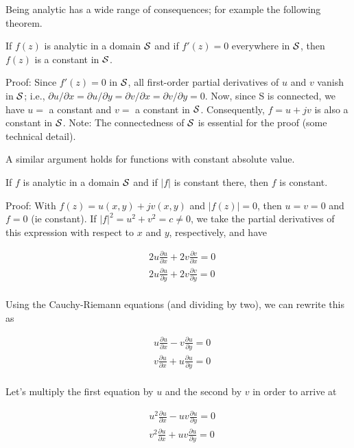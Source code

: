 Being analytic has a wide range of consequences; for example the following theorem.

\begin{theorem}
    If $f(z)$ is analytic in a domain $\mathcal{S}$ and if $f'(z) = 0$ everywhere in $\mathcal{S}$, then $f(z)$ is a constant in $\mathcal{S}$.
\end{theorem}

Proof: Since $f'(z) = 0$ in $\mathcal{S}$, all first-order partial derivatives of $u$ and $v$ vanish in $\mathcal{S}$; i.e., $\partial u / \partial x = \partial u / \partial y = \partial v / \partial x = \partial v / \partial y = 0$. Now, since S is connected, we have $u = $ a constant and $v = $ a constant in $\mathcal{S}$. Consequently, $f = u + jv$ is also a constant in $\mathcal{S}$. Note: The connectedness of $\mathcal{S}$ is essential for the proof (some technical detail).

A similar argument holds for functions with constant absolute value.

\begin{theorem}
    If $f$ is analytic in a domain $\mathcal{S}$ and if $|f|$ is constant there, then $f$ is constant.
\end{theorem}

Proof: With $f(z) = u(x,y) + j v(x,y)$ and $|f(z)| = 0$, then $u = v = 0$ and $f = 0$ (ie constant). If $|f|^2 = u^2 + v^2 = c \neq 0$, we take the partial derivatives of this expression with respect to $x$ and $y$, respectively, and have

\begin{align*}
& 2 u \frac{\partial u}{\partial x} + 2 v \frac{\partial v}{\partial x} = 0 \\
& 2 u \frac{\partial u}{\partial y} + 2 v \frac{\partial v}{\partial y} = 0 \\
\end{align*}

Using the Cauchy-Riemann equations (and dividing by two), we can rewrite this as

\begin{align*}
& u \frac{\partial u}{\partial x} - v \frac{\partial u}{\partial y} = 0 \\
& v \frac{\partial u}{\partial x} + u \frac{\partial u}{\partial y} = 0 \\
\end{align*}

Let's multiply the first equation by $u$ and the second by $v$ in order to arrive at

\begin{align*}
& u^2 \frac{\partial u}{\partial x} - u v \frac{\partial u}{\partial y} = 0 \\
& v^2 \frac{\partial u}{\partial x} + u v \frac{\partial u}{\partial y} = 0 \\
\end{align*}

